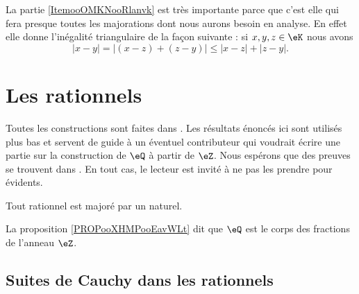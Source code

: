 \begin{remark}      \label{RemooJCAUooKkuglX}
    La partie \ref{ItemooOMKNooRlanvk} est très importante parce que c'est elle qui fera presque toutes les majorations dont nous aurons besoin en analyse. En effet elle donne l'inégalité triangulaire de la façon suivante : si \( x,y,z\in \eK\) nous avons
    \begin{equation}
        | x-y |= |  (x-z)+(z-y) |\leq | x-z |+| z-y |.
    \end{equation}
\end{remark}

\section{Les rationnels}

Toutes les constructions sont faites dans \cite{RWWJooJdjxEK}. Les résultats énoncés ici sont utilisés plus bas et servent de guide à un éventuel contributeur qui voudrait écrire une partie sur la construction de \( \eQ\) à partir de \( \eZ\). Nous espérons que des preuves se trouvent dans \cite{RWWJooJdjxEK}. En tout cas, le lecteur est invité à ne pas les prendre pour évidents.

\begin{lemma} \label{LEMooEBTIooGMoHsj}
    Tout rationnel est majoré par un naturel.
\end{lemma}

La proposition \ref{PROPooXHMPooEavWLt} dit que \( \eQ\) est le corps des fractions de l'anneau \( \eZ\).

\subsection{Suites de Cauchy dans les rationnels}

